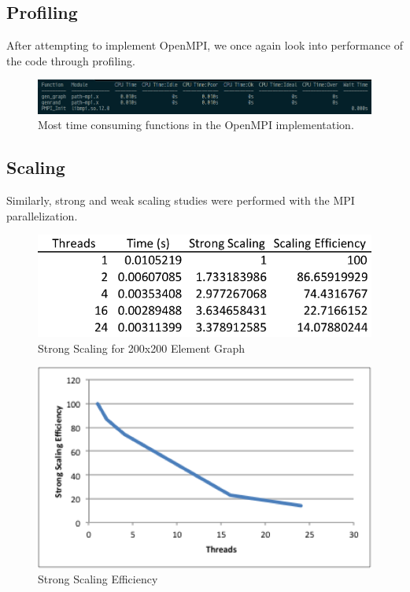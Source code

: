 \documentclass{article}
\begin{document}
\subsection{Profiling}
After attempting to implement OpenMPI, we once again look into performance of the code through profiling. 
	\begin{figure}[h!]
		\begin{center}
			\includegraphics[width=0.7\columnwidth]{amplxe_mpi}
			\caption{Most time consuming functions in the OpenMPI implementation.}
			\label{amplxe_mpi}
		\end{center}
	\end{figure}

\subsection{Scaling}
Similarly, strong and weak scaling studies were performed with the MPI parallelization.

	\begin{figure}[h!]
		\begin{center}
			\includegraphics[width=0.5\columnwidth]{st_table_mpi}
			\caption{Strong Scaling for 200x200 Element Graph}
			\label{amplxe}
		\end{center}
	\end{figure}
	
	\begin{figure}[h!]
		\begin{center}
			\includegraphics[width=0.7\columnwidth]{st_graph_mpi}
			\caption{Strong Scaling Efficiency}
			\label{amplxe}
		\end{center}
	\end{figure}
	
\end{document}
